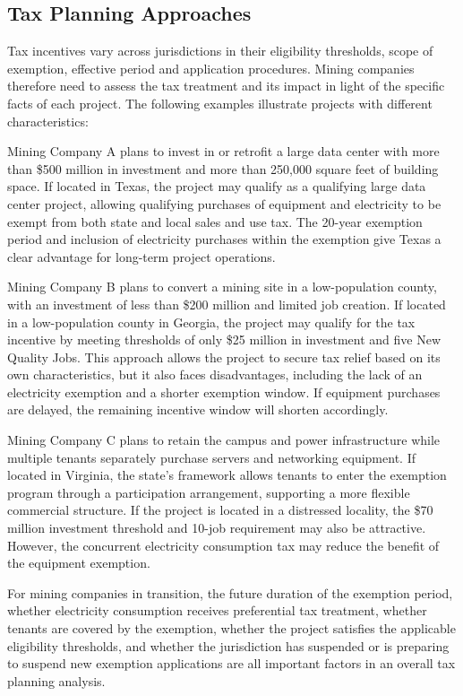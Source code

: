\subsection{Tax Planning Approaches}

Tax incentives vary across jurisdictions in their eligibility thresholds, scope of exemption, effective period and application procedures. Mining companies therefore need to assess the tax treatment and its impact in light of the specific facts of each project. The following examples illustrate projects with different characteristics:

Mining Company A plans to invest in or retrofit a large data center with more than \$500 million in investment and more than 250,000 square feet of building space. If located in Texas, the project may qualify as a qualifying large data center project, allowing qualifying purchases of equipment and electricity to be exempt from both state and local sales and use tax. The 20-year exemption period and inclusion of electricity purchases within the exemption give Texas a clear advantage for long-term project operations.

Mining Company B plans to convert a mining site in a low-population county, with an investment of less than \$200 million and limited job creation. If located in a low-population county in Georgia, the project may qualify for the tax incentive by meeting thresholds of only \$25 million in investment and five New Quality Jobs. This approach allows the project to secure tax relief based on its own characteristics, but it also faces disadvantages, including the lack of an electricity exemption and a shorter exemption window. If equipment purchases are delayed, the remaining incentive window will shorten accordingly.

Mining Company C plans to retain the campus and power infrastructure while multiple tenants separately purchase servers and networking equipment. If located in Virginia, the state's framework allows tenants to enter the exemption program through a participation arrangement, supporting a more flexible commercial structure. If the project is located in a distressed locality, the \$70 million investment threshold and 10-job requirement may also be attractive. However, the concurrent electricity consumption tax may reduce the benefit of the equipment exemption.

For mining companies in transition, the future duration of the exemption period, whether electricity consumption receives preferential tax treatment, whether tenants are covered by the exemption, whether the project satisfies the applicable eligibility thresholds, and whether the jurisdiction has suspended or is preparing to suspend new exemption applications are all important factors in an overall tax planning analysis.

\FloatBarrier
